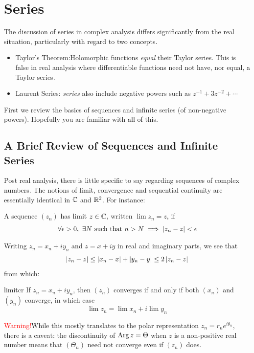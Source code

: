 \graphicspath{{5series/asy/}}
\thispagestyle{empty}


\section{Series}

The discussion of series in complex analysis differs significantly from the real situation, particularly with regard to two concepts.
\begin{itemize}
  \item Taylor's Theorem:\quad Holomorphic functions \emph{equal} their Taylor series. This is false in real analysis where differentiable functions need not have, nor equal, a Taylor series.
  \item Laurent Series: \emph{series} also include negative powers such as $z^{-1}+3z^{-2}+\cdots$
\end{itemize}
First we review the basics of sequences and infinite series (of non-negative powers). Hopefully you are familiar with all of this.

\subsection{A Brief Review of Sequences and Infinite Series}


Post real analysis, there is little specific to say regarding sequences of complex numbers. The notions of limit, convergence and sequential continuity are essentially identical in $\mathbb{C}$ and $\mathbb{R}^2$. For instance:

\begin{defn}{}{}
A sequence $(z_n)$ has limit $z\in\mathbb{C}$, written $\lim z_n=z$, if
\[\forall\epsilon>0,\ \exists N\text{ such that }n>N\implies \left| z_n-z\right|<\epsilon\]
\end{defn}

Writing $z_n=x_n+ iy_n$ and $z=x+iy$ in real and imaginary parts, we see that
\[\left| z_n-z\right|\le\left| x_n-x\right|+\left| y_n-y\right|\le 2\left| z_n-z\right|\]
from which:

\begin{lemm}{}{limitcr}
If $z_n=x_n+iy_n$, then $(z_n)$ converges if and only if both $(x_n)$ and $(y_n)$ converge, in which case
\[\lim z_n=\lim x_n+i\lim y_n\]
\end{lemm}

\textcolor{red}{Warning!}\quad While this mostly translates to the polar representation $z_n=r_ne^{i\theta_n}$, there is a caveat: the discontinuity of $\operatorname{Arg} z = \Theta$ when $z$ is a non-positive real number means that $(\Theta_n)$ need not converge even if $(z_n)$ does.

